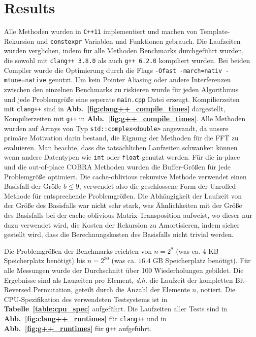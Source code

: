 \documentclass[10pt]{article}
\begin{document}
\section*{Results}
Alle Methoden wurden in {\tt C++11} implementiert und machen von Template-Rekursion 
und {\tt constexpr} Variablen und Funktionen gebrauch. Die Laufzeiten wurden verglichen, indem für alle Methoden
Benchmarks durchgeführt wurden, die sowohl mit {\tt clang++ 3.8.0} als auch {\tt g++ 6.2.0} kompiliert wurden.
Bei beiden Compiler wurde die Optimierung durch die Flags {\tt -Ofast -march=nativ -mtune=native} genutzt. 
Um kein Pointer Aliasing oder andere Interferenzen zwischen den einzelnen Benchmarks zu riskieren wurde für jeden Algorithmus
und jede Problemgröße eine seperate {\tt main.cpp} Datei erzeugt. Kompilierzeiten mit 
{\tt clang++} sind in {\bf
  Abb.~\ref{fig:clang++_compile_times}} dargestellt, Kompilierzeiten mit {\tt g++}
in {\bf Abb.~\ref{fig:g++_compile_times}}. Alle Methoden wurden auf Arrays von Typ
{\tt std::complex<double>} angewandt, da unsere primäre Motivation darin bestand, die Eignung der Methoden für die FFT zu evaluieren.
Man beachte, dass die tatsächlichen Laufzeiten schwanken können wenn andere Datentypen wie {\tt int} oder {\tt float} genutzt werden.
Für die in-place und die out-of-place COBRA Methoden wurden die Buffer-Größen für jede Problemgröße optimiert.
Die cache-oblivious rekursive Methode verwendet einen Basisfall der Größe $b \leq 9$, verwendet also die geschlossene Form 
der Unrolled-Methode für entsprechende Problemgrößen. Die Abhängigkeit der Laufzeit von der Größe des Basisfalls war 
nicht sehr stark, was Ähnlichkeiten mit der Größe des Basisfalls bei der cache-oblivious Matrix-Transposition aufweist, wo dieser nur 
dazu verwendet wird, die Kosten der Rekursion zu Amortisieren, indem sicher gestellt wird, dass die Berechnungskosten des Basisfalls nicht 
trivial werden.

Die Problemgrößen der Benchmarks reichten von $n=2^8$ (was ca. $4$ KB Speicherplatz benötigt) bis $n=2^{30}$
(was ca. $16.4$ GB Speicherplatz benötigt). Für alle Messungen wurde der Durchschnitt über 100 Wiederholungen gebildet. 
Die Ergebnisse sind als Lauzeiten pro Element, \emph{d.h.} die Laufzeit der kompletten Bit-Reversed Permutation, 
geteilt durch die Anzahl der Elemente $n$, notiert. Die CPU-Spezifikation des verwendeten Testsystems 
ist in {\bf Tabelle~\ref{table:cpu_spec}} aufgeführt. Die Laufzeiten aller Tests sind in {\bf Abb.~\ref{fig:clang++_runtimes}} 
für {\tt clang++} und in {\bf Abb.~\ref{fig:g++_runtimes}} für {\tt g++} aufgeführt.
\end{document}
